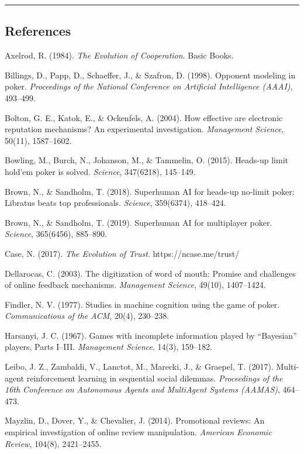 \documentclass[
]{article}
\begin{document}
\begin{center}\rule{0.5\linewidth}{0.5pt}\end{center}

\hypertarget{references}{%
\subsection{References}\label{references}}

Axelrod, R. (1984). \emph{The Evolution of Cooperation}. Basic Books.

Billings, D., Papp, D., Schaeffer, J., \& Szafron, D. (1998). Opponent
modeling in poker. \emph{Proceedings of the National Conference on
Artificial Intelligence (AAAI)}, 493--499.

Bolton, G. E., Katok, E., \& Ockenfels, A. (2004). How effective are
electronic reputation mechanisms? An experimental investigation.
\emph{Management Science}, 50(11), 1587--1602.

Bowling, M., Burch, N., Johanson, M., \& Tammelin, O. (2015). Heads-up
limit hold'em poker is solved. \emph{Science}, 347(6218), 145--149.

Brown, N., \& Sandholm, T. (2018). Superhuman AI for heads-up no-limit
poker: Libratus beats top professionals. \emph{Science}, 359(6374),
418--424.

Brown, N., \& Sandholm, T. (2019). Superhuman AI for multiplayer poker.
\emph{Science}, 365(6456), 885--890.

Case, N. (2017). \emph{The Evolution of Trust}. https://ncase.me/trust/

Dellarocas, C. (2003). The digitization of word of mouth: Promise and
challenges of online feedback mechanisms. \emph{Management Science},
49(10), 1407--1424.

Findler, N. V. (1977). Studies in machine cognition using the game of
poker. \emph{Communications of the ACM}, 20(4), 230--238.

Harsanyi, J. C. (1967). Games with incomplete information played by
``Bayesian'' players, Parts I--III. \emph{Management Science}, 14(3),
159--182.

Leibo, J. Z., Zambaldi, V., Lanctot, M., Marecki, J., \& Graepel, T.
(2017). Multi-agent reinforcement learning in sequential social
dilemmas. \emph{Proceedings of the 16th Conference on Autonomous Agents
and MultiAgent Systems (AAMAS)}, 464--473.

Mayzlin, D., Dover, Y., \& Chevalier, J. (2014). Promotional reviews: An
empirical investigation of online review manipulation. \emph{American
Economic Review}, 104(8), 2421--2455.
\end{document}
